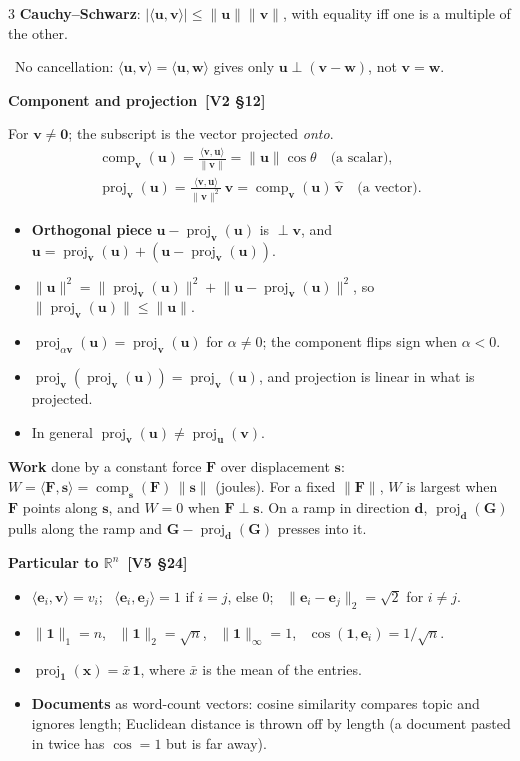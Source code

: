 \documentclass[8pt]{extarticle}
\newcommand{\sub}[1]{\par\vspace{3pt}\noindent
  {\color{RoyalBlue}\bfseries\sffamily #1}\par\vspace{0.5pt}}
\newcommand{\src}[1]{{\color{gray}\,[#1]}}
\newcommand{\warn}[1]{\par\noindent{\color{BrickRed}\bfseries!}\ #1\par}
\newcommand{\R}{\mathbb{R}}
\newcommand{\vc}[1]{\mathbf{#1}}
\newcommand{\uv}[1]{\hat{\vc{#1}}}
\newcommand{\one}{\mathbf{1}}
\newcommand{\norm}[1]{\lVert #1\rVert}
\newcommand{\ip}[2]{\langle #1,#2\rangle}
\newcommand{\proj}[2]{\operatorname{proj}_{#1}(#2)}
\newcommand{\comp}[2]{\operatorname{comp}_{#1}(#2)}
\begin{document}
\begin{multicols*}{3}
\textbf{Cauchy--Schwarz}:
$\lvert\ip{\vc{u}}{\vc{v}}\rvert\le\norm{\vc{u}}\norm{\vc{v}}$, with equality
iff one is a multiple of the other.

\warn{No cancellation: $\ip{\vc{u}}{\vc{v}}=\ip{\vc{u}}{\vc{w}}$ gives only
$\vc{u}\perp(\vc{v}-\vc{w})$, not $\vc{v}=\vc{w}$.}

\sub{2.4\enspace Component and projection \src{V2 \S12}}
For $\vc{v}\neq\vc{0}$; the subscript is the vector projected \emph{onto}.
\begin{gather*}
  \comp{\vc{v}}{\vc{u}}=\frac{\ip{\vc{v}}{\vc{u}}}{\norm{\vc{v}}}
  =\norm{\vc{u}}\cos\theta\quad\text{(a scalar)},\\
  \proj{\vc{v}}{\vc{u}}=\frac{\ip{\vc{v}}{\vc{u}}}{\norm{\vc{v}}^{2}}\,\vc{v}
  =\comp{\vc{v}}{\vc{u}}\,\uv{v}\quad\text{(a vector)}.
\end{gather*}
\begin{itemize}
  \item \textbf{Orthogonal piece} $\vc{u}-\proj{\vc{v}}{\vc{u}}$ is
        $\perp\vc{v}$, and
        $\vc{u}=\proj{\vc{v}}{\vc{u}}+(\vc{u}-\proj{\vc{v}}{\vc{u}})$.
  \item $\norm{\vc{u}}^{2}=\norm{\proj{\vc{v}}{\vc{u}}}^{2}
        +\norm{\vc{u}-\proj{\vc{v}}{\vc{u}}}^{2}$, so
        $\norm{\proj{\vc{v}}{\vc{u}}}\le\norm{\vc{u}}$.
  \item $\proj{\alpha\vc{v}}{\vc{u}}=\proj{\vc{v}}{\vc{u}}$ for
        $\alpha\neq0$; the component flips sign when $\alpha<0$.
  \item $\proj{\vc{v}}{\proj{\vc{v}}{\vc{u}}}=\proj{\vc{v}}{\vc{u}}$, and
        projection is linear in what is projected.
  \item In general $\proj{\vc{v}}{\vc{u}}\neq\proj{\vc{u}}{\vc{v}}$.
\end{itemize}
\textbf{Work} done by a constant force $\vc{F}$ over displacement $\vc{s}$:
$W=\ip{\vc{F}}{\vc{s}}=\comp{\vc{s}}{\vc{F}}\,\norm{\vc{s}}$ (joules). For a
fixed $\norm{\vc{F}}$, $W$ is largest when $\vc{F}$ points along $\vc{s}$, and
$W=0$ when $\vc{F}\perp\vc{s}$. On a ramp in direction $\vc{d}$,
$\proj{\vc{d}}{\vc{G}}$ pulls along the ramp and
$\vc{G}-\proj{\vc{d}}{\vc{G}}$ presses into it.

\sub{2.5\enspace Particular to $\R^{n}$ \src{V5 \S24}}
\begin{itemize}
  \item $\ip{\vc{e}_i}{\vc{v}}=v_i$; \ $\ip{\vc{e}_i}{\vc{e}_j}=1$ if $i=j$,
        else $0$; \ $\norm{\vc{e}_i-\vc{e}_j}_2=\sqrt2$ for $i\neq j$.
  \item $\norm{\one}_1=n$, \ $\norm{\one}_2=\sqrt n$, \
        $\norm{\one}_\infty=1$, \ $\cos(\one,\vc{e}_i)=1/\sqrt n$.
  \item $\proj{\one}{\vc{x}}=\bar{x}\,\one$, where $\bar{x}$ is the mean of
        the entries.
  \item \textbf{Documents} as word-count vectors: cosine similarity compares
        topic and ignores length; Euclidean distance is thrown off by length
        (a document pasted in twice has $\cos=1$ but is far away).
\end{itemize}


\end{multicols*}
\end{document}
